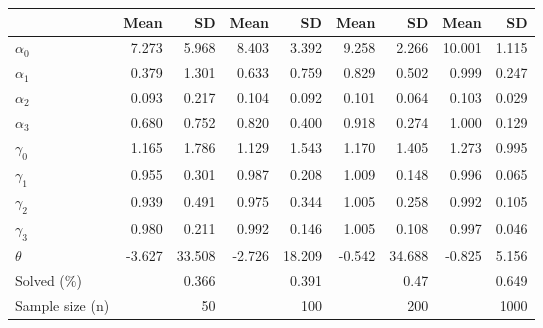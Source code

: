 
\begin{tabular}[t]{lrrrrrrrr}
\toprule
  & Mean & SD & Mean  & SD  & Mean   & SD   & Mean    & SD   \\
\midrule
$\alpha_{0}$ & 7.273 & 5.968 & 8.403 & 3.392 & 9.258 & 2.266 & 10.001 & 1.115\\
$\alpha_{1}$ & 0.379 & 1.301 & 0.633 & 0.759 & 0.829 & 0.502 & 0.999 & 0.247\\
$\alpha_{2}$ & 0.093 & 0.217 & 0.104 & 0.092 & 0.101 & 0.064 & 0.103 & 0.029\\
$\alpha_{3}$ & 0.680 & 0.752 & 0.820 & 0.400 & 0.918 & 0.274 & 1.000 & 0.129\\
$\gamma_{0}$ & 1.165 & 1.786 & 1.129 & 1.543 & 1.170 & 1.405 & 1.273 & 0.995\\
$\gamma_{1}$ & 0.955 & 0.301 & 0.987 & 0.208 & 1.009 & 0.148 & 0.996 & 0.065\\
$\gamma_{2}$ & 0.939 & 0.491 & 0.975 & 0.344 & 1.005 & 0.258 & 0.992 & 0.105\\
$\gamma_{3}$ & 0.980 & 0.211 & 0.992 & 0.146 & 1.005 & 0.108 & 0.997 & 0.046\\
$\theta$ & -3.627 & 33.508 & -2.726 & 18.209 & -0.542 & 34.688 & -0.825 & 5.156\\
Solved (\%) &  & 0.366 &  & 0.391 &  & 0.47 &  & 0.649\\
Sample size (n) &  & 50 &  & 100 &  & 200 &  & 1000\\
\bottomrule
\end{tabular}
